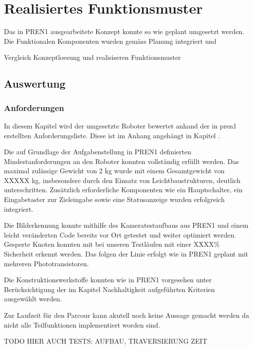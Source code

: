 \section{Realisiertes Funktionsmuster}

Das in PREN1 ausgearbeitete Konzept konnte so wie geplant umgesetzt werden. Die Funktionalen Komponenten wurden gemäss Planung integriert und 

Vergleich  Konzeptloesung und realisiseren Funktionsmuster



\subsection{Auswertung}

\subsubsection{Anforderungen}

In diesem Kapitel wird der umgesetzte Roboter bewertet anhand der in \acrshort{pren1} erstellten Anforderungsliste. Diese ist im Anhang angehängt in Kapitel .

Die auf Grundlage der Aufgabenstellung in PREN1 definierten Mindestanforderungen an den Roboter konnten vollständig erfüllt werden. Das maximal zulässige Gewicht von 2 kg wurde mit einem Gesamtgewicht von XXXXX kg, insbesondere durch den Einsatz von Leichtbaustrukturen, deutlich unterschritten. Zusätzlich erforderliche Komponenten wie ein Hauptschalter, ein Eingabetaster zur Zieleingabe sowie eine Statusanzeige wurden erfolgreich integriert.

Die Bilderkennung konnte mithilfe des Kameratestaufbaus aus PREN1 und einem leicht veränderten Code bereits vor Ort getestet und weiter optimiert werden. Gesperte Knoten konnten mit bei unseren Testläufen mit einer XXXX\% Sicherheit erkennt werden. Das folgen der Linie erfolgt wie in PREN1 geplant mit mehreren Phototransistoren. 

Die Konstruktionswerkstoffe konnten wie in PREN1 vorgesehen unter Berücksichtigung der im Kapitel Nachhaltigkeit aufgeführten Kriterien ausgewählt werden.

Zur Laufzeit für den Parcour kann akutell noch keine Aussage gemacht werden da nicht alle Teilfunktionen implementiert worden sind. 



TODO HIER AUCH TESTS: AUFBAU, TRAVERSIERUNG ZEIT